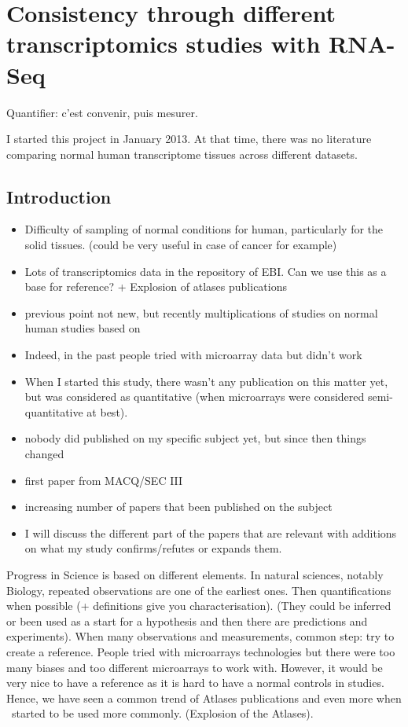 \chapter{Consistency through different transcriptomics studies with RNA-Seq}
\label{ch:Transcriptomics}
\setlength{\epigraphwidth}{0.45\textwidth}
\setlength{\epigraphrule}{0.1pt}
\epigraph{Quantifier: c'est convenir, puis mesurer.}{\cite{Desrosieres}}


I started this project in January 2013. At that time, there was no
literature comparing normal human transcriptome tissues across different datasets.

\section{Introduction}

\begin{itemize}
    \item Difficulty of sampling of normal conditions for human, particularly
        for the solid tissues. (could be very useful in case of cancer for
        example)
    \item Lots of transcriptomics data in the repository of EBI. Can we use
        this as a base for reference? + Explosion of atlases publications
    \item previous point not new, but recently multiplications of studies on
        normal human studies based on \Rnaseq
    \item Indeed, in the past people tried with microarray data but didn't work
    \item When I started this study, there wasn't any publication on this matter
        yet, but \Rnaseq was considered as quantitative (when microarrays were
        considered semi-quantitative at best).
    \item nobody did published on my specific subject yet, but since then things changed
    \item first paper from MACQ/SEC III
    \item increasing number of papers that been published on the subject
    \item I will discuss the different part of the papers that are relevant
        with additions on what my study confirms/refutes or expands them.
\end{itemize}

Progress in Science is based on different elements. In natural sciences, notably
Biology, repeated observations are one of the earliest ones. Then quantifications
when possible (+ definitions give you characterisation). (They could be inferred or
been used as a start for a hypothesis and then there are predictions and
experiments). When many observations and measurements, common step: try to create
a reference. People tried with microarrays technologies but there were too many
biases and too different microarrays to work with. However, it would be very nice
to have a reference as it is hard to have a normal controls in studies. Hence, we
have seen a common trend of Atlases publications and even more when \Rnaseq\ started
to be used more commonly. (Explosion of the Atlases).

